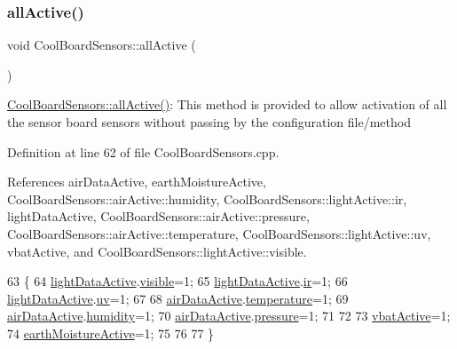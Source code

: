 \subsubsection{\texorpdfstring{all\+Active()}{allActive()}}
{\footnotesize\ttfamily void Cool\+Board\+Sensors\+::all\+Active (\begin{DoxyParamCaption}{ }\end{DoxyParamCaption})}

\hyperlink{classCoolBoardSensors_aa432c5aac88f89c31a10766390f23e0b}{Cool\+Board\+Sensors\+::all\+Active()}\+: This method is provided to allow activation of all the sensor board sensors without passing by the configuration file/method 

Definition at line 62 of file Cool\+Board\+Sensors.\+cpp.



References air\+Data\+Active, earth\+Moisture\+Active, Cool\+Board\+Sensors\+::air\+Active\+::humidity, Cool\+Board\+Sensors\+::light\+Active\+::ir, light\+Data\+Active, Cool\+Board\+Sensors\+::air\+Active\+::pressure, Cool\+Board\+Sensors\+::air\+Active\+::temperature, Cool\+Board\+Sensors\+::light\+Active\+::uv, vbat\+Active, and Cool\+Board\+Sensors\+::light\+Active\+::visible.


\begin{DoxyCode}
63 \{
64     \hyperlink{classCoolBoardSensors_ac4deb1cf41bac8b91c780c92fab00ba4}{lightDataActive}.\hyperlink{structCoolBoardSensors_1_1lightActive_abcbba296b6a95e67c0cd2555d9dd50c7}{visible}=1;
65     \hyperlink{classCoolBoardSensors_ac4deb1cf41bac8b91c780c92fab00ba4}{lightDataActive}.\hyperlink{structCoolBoardSensors_1_1lightActive_a67700895349b95ceb263f1a6da756315}{ir}=1;
66     \hyperlink{classCoolBoardSensors_ac4deb1cf41bac8b91c780c92fab00ba4}{lightDataActive}.\hyperlink{structCoolBoardSensors_1_1lightActive_a949a7aaf5166d981de8fe0fd93da20d6}{uv}=1;  
67 
68     \hyperlink{classCoolBoardSensors_abff8dfeccb2f7689847bb64d5f1cd31e}{airDataActive}.\hyperlink{structCoolBoardSensors_1_1airActive_a9a6633c426b0508e30ebc1832ec6d745}{temperature}=1;
69     \hyperlink{classCoolBoardSensors_abff8dfeccb2f7689847bb64d5f1cd31e}{airDataActive}.\hyperlink{structCoolBoardSensors_1_1airActive_ae5740445054b27415e22f450576accb7}{humidity}=1;
70     \hyperlink{classCoolBoardSensors_abff8dfeccb2f7689847bb64d5f1cd31e}{airDataActive}.\hyperlink{structCoolBoardSensors_1_1airActive_ab200826a70d1dc9945f5efb6b9c732ed}{pressure}=1;
71 
72 
73     \hyperlink{classCoolBoardSensors_af5039ad760b0ff0aa7eee16c55e81702}{vbatActive}=1;
74     \hyperlink{classCoolBoardSensors_a46dfddb8a12720e92cd2825ef09023c8}{earthMoistureActive}=1;
75 
76 
77 \}
\end{DoxyCode}
\mbox{\label{classCoolBoardSensors_a97095823ef7c8f5290812f1405b966b3}} 
